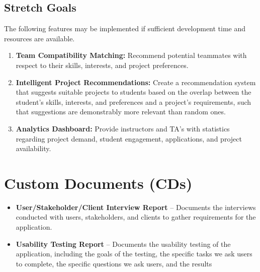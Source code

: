 \documentclass{article}
\begin{document}
\subsection{Stretch Goals}

The following features may be implemented if sufficient development time and
resources are available.

\begin{enumerate}
    \item \textbf{Team Compatibility Matching:}
          Recommend potential teammates with respect to their skills, interests, and project preferences.

    \item \textbf{Intelligent Project Recommendations:}
          Create a recommendation system that suggests suitable projects to students based on the overlap
          between the student's skills, interests, and preferences and a project's requirements,
          such that suggestions are demonstrably more relevant than random ones.

    \item \textbf{Analytics Dashboard:}
          Provide instructors and TA's with statistics regarding project demand, student engagement, applications, and project availability.
\end{enumerate}

\section{Custom Documents (CDs)}


\begin{itemize}
    \item \textbf{User/Stakeholder/Client Interview Report} -- Documents the
          interviews conducted with users, stakeholders, and clients to gather
          requirements for the application.

    \item \textbf{Usability Testing Report} -- Documents the usability testing of the
          application, including the goals of the testing, the specific tasks we ask users to complete, the specific questions we ask users, and the results
\end{itemize}
\end{document}
